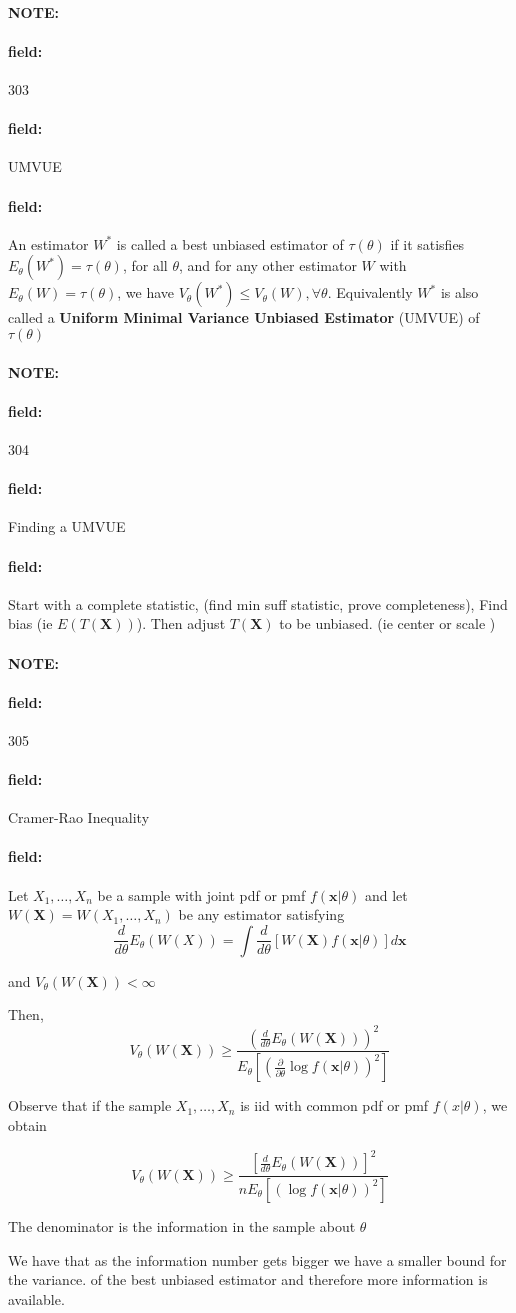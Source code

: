 \documentclass[12pt]{article}
\newenvironment{note}{\paragraph{NOTE:}}{}
\newenvironment{field}{\paragraph{field:}}{}
\begin{document}
\begin{note} \begin{field} \tiny 303 \end{field}
  \begin{field}
    UMVUE
  \end{field}
  \begin{field}
    An estimator $W^*$ is called a best unbiased estimator of $\tau(\theta)$ if it satisfies $E_\theta(W^*) = \tau(\theta)$, for all $\theta$, and for any other estimator $W$ with $E_\theta(W) = \tau(\theta)$, we have $V_\theta(W^*)\leq V_\theta(W), \forall \theta$. Equivalently $W^*$ is also called a \textbf{Uniform Minimal Variance Unbiased Estimator} (UMVUE) of $\tau(\theta)$
  \end{field}
\end{note}

\begin{note} \begin{field} \tiny 304 \end{field}
  \begin{field}
    Finding a UMVUE
  \end{field}
  \begin{field}
    Start with a complete statistic, (find min suff statistic, prove completeness), Find bias (ie $E(T(\mathbf{X}))$). Then adjust $T(\mathbf{X})$ to be unbiased. (ie center or scale )
  \end{field}
\end{note}

\begin{note} \begin{field} \tiny 305 \end{field}
  \begin{field}
    Cramer-Rao Inequality
  \end{field}
  \begin{field}
    Let $X_1, \ldots , X_n$ be a sample with joint pdf or pmf $f(\mathbf{x}|\theta)$ and let $W(\mathbf{X}) = W(X_1, \ldots , X_n)$ be any estimator satisfying
    $$\frac{d}{d\theta} E_\theta(W(X)) = \int \frac{d}{d\theta} [W(\mathbf{X})f(\mathbf{x}|\theta)] d \mathbf{x}$$

    and $V_\theta(W(\mathbf{X}))< \infty$

    Then,
    $$V_\theta(W(\mathbf{X})) \geq \frac{(\frac{d}{d\theta}E_\theta(W(\mathbf{X})))^2}{E_\theta[( \frac{\partial}{\partial \theta}\log f(\mathbf{x}|\theta))^2]}$$

    Observe that if the sample $X_1, \ldots , X_n$ is iid with common pdf or pmf $f(x|\theta)$, we obtain

    $$ V_\theta (W(\mathbf{X})) \geq \frac{[\frac{d}{d\theta}E_\theta(W(\mathbf{X}))]^2}{nE_\theta[(\log f(\mathbf{x}|\theta))^2]}$$

    The denominator is the information in the sample about $\theta$

    We have that as the information number gets bigger we have a smaller bound for the variance. of the best unbiased estimator and therefore more information is available.
  \end{field}
\end{note}
\end{document}
